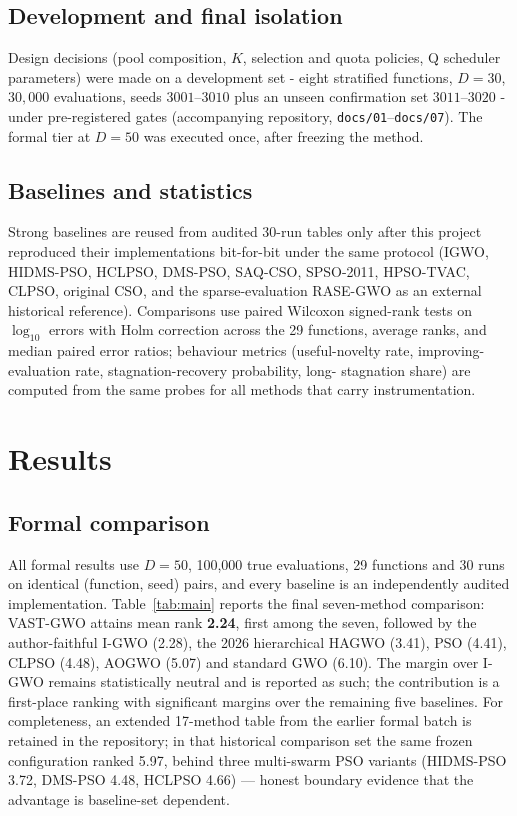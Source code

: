 \documentclass[journal]{IEEEtran}
\newcommand{\method}{VAST-GWO}
\begin{document}
\subsection{Development and final isolation}
Design decisions (pool composition, $K$, selection and quota policies, Q
scheduler parameters) were made on a development set - eight stratified
functions, $D=30$, $30{,}000$ evaluations, seeds $3001$--$3010$ plus an
unseen confirmation set $3011$--$3020$ - under pre-registered gates
(accompanying repository, \texttt{docs/01}--\texttt{docs/07}). The formal
tier at $D=50$ was executed once, after freezing the method.

\subsection{Baselines and statistics}
Strong baselines are reused from audited 30-run tables only after this
project reproduced their implementations bit-for-bit under the same protocol
(IGWO, HIDMS-PSO, HCLPSO, DMS-PSO, SAQ-CSO, SPSO-2011, HPSO-TVAC, CLPSO,
original CSO, and the sparse-evaluation RASE-GWO as an external historical
reference). Comparisons use paired Wilcoxon signed-rank tests on
$\log_{10}$ errors with Holm correction across the 29 functions, average
ranks, and median paired error ratios; behaviour metrics (useful-novelty
rate, improving-evaluation rate, stagnation-recovery probability, long-
stagnation share) are computed from the same probes for all methods that
carry instrumentation.

\section{Results}
\label{sec:results}
\subsection{Formal comparison}
All formal results use $D=50$, 100{,}000 true evaluations, 29 functions and
30 runs on identical (function, seed) pairs, and every baseline is an
independently audited implementation. Table~\ref{tab:main} reports the final
seven-method comparison: \method{} attains mean rank \textbf{2.24}, first
among the seven, followed by the author-faithful I-GWO (2.28), the 2026
hierarchical HAGWO (3.41), PSO (4.41), CLPSO (4.48), AOGWO (5.07) and standard
GWO (6.10). The margin over I-GWO remains statistically neutral and is
reported as such; the contribution is a first-place ranking with significant
margins over the remaining five baselines. For completeness, an extended
17-method table from the earlier formal batch is retained in the repository;
in that historical comparison set the same frozen configuration ranked 5.97,
behind three multi-swarm PSO variants (HIDMS-PSO 3.72, DMS-PSO 4.48,
HCLPSO 4.66) --- honest boundary evidence that the advantage is
baseline-set dependent.
\end{document}
